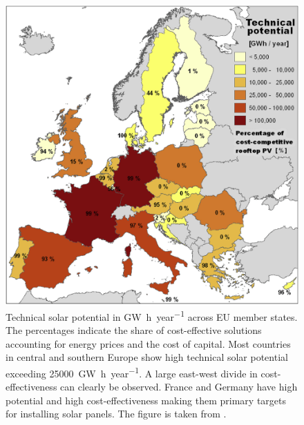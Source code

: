 \documentclass{article} %
\begin{document}
\begin{figure}
	\centering
	\label{fig:map}
	\caption{Technical solar potential in \si{\giga\watt\hour\per year} across EU member states. The percentages indicate the share of cost-effective solutions accounting for energy prices and the cost of capital. Most countries in central and southern Europe show high technical solar potential exceeding \SI{25000}{\giga\watt\hour\per year}. A large east-west divide in cost-effectiveness can clearly be observed. France and Germany have high potential and high cost-effectiveness making them primary targets for installing solar panels. The figure is taken from \citet{bodis2019high}.}
	\includegraphics[width=0.7\linewidth]{../figures/technical_potential_eu.jpg}
\end{figure}
\end{document}
